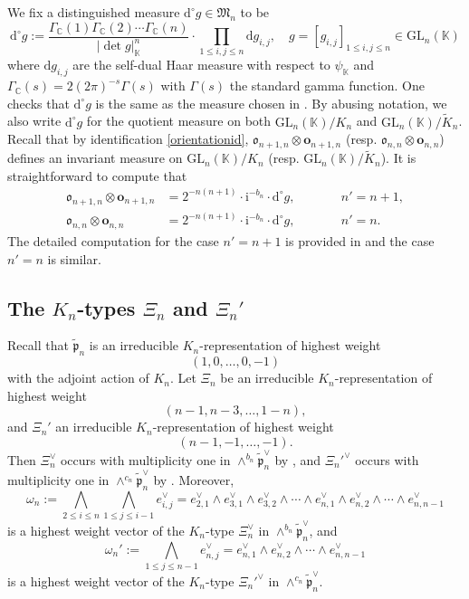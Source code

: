 \documentclass[12pt, a4paper]{amsart}
\newcommand{\GL}{{\mathrm{GL}}}
\newcommand{\C}{\mathbb{C}}
\newcommand{\K}{\mathbb{K}}
\theoremstyle{Theorem}
\theoremstyle{Theorem}
\theoremstyle{Theorem}
\theoremstyle{Theorem}
\theoremstyle{Plain}
\theoremstyle{Definition}
\begin{document}
	We fix a distinguished measure $\mathrm{d}^{\circ}g\in\mathfrak{M}_{n}$ to be 
	\[
	\mathrm{d}^{\circ}g:=\frac{\Gamma_{\C}(1)\Gamma_{\C}(2)\cdots\Gamma_{\C}(n)}{|\det g|_{\K}^n}\cdot\prod_{1\leq i,j\leq n}\mathrm{d}g_{i,j},\quad g=[g_{i,j}]_{1\leq i,j\leq n}\in\GL_{n}(\K)
	\]
	where $\mathrm{d}g_{i,j}$ are the self-dual Haar measure with respect to $\psi_{\K}$ and $\Gamma_{\C}(s)=2(2\pi)^{-s}\Gamma(s)$ with $\Gamma(s)$ the standard gamma function. One checks that $\mathrm{d}^{\circ}g$ is the same as the measure chosen in \cite[Section 2.2]{IM}. By abusing notation, we also write $\mathrm{d}^{\circ}g$ for the quotient measure on both $\GL_n(\K)/K_n$ and $\GL_n(\K)/\widetilde{K}_n$. Recall that by identification \eqref{orientationid}, $\mathfrak{o}_{n+1,n}\otimes\mathbf{o}_{n+1,n}$ (resp. $\mathfrak{o}_{n,n}\otimes\mathbf{o}_{n,n}$) defines an invariant measure on $\GL_n(\K)/K_n$ (resp. $\GL_n(\K)/\widetilde{K}_n$). It is straightforward to compute that
	\begin{equation}
		\label{measureid}
		\begin{aligned}
			\mathfrak{o}_{n+1,n}\otimes\mathbf{o}_{n+1,n}&=2^{-n(n+1)}\cdot\mathrm{i}^{-b_n}\cdot\mathrm{d}^{\circ}g,&\qquad&n'=n+1,\\
			\mathfrak{o}_{n,n}\otimes\mathbf{o}_{n,n}&=2^{-n(n+1)}\cdot\mathrm{i}^{-b_n}\cdot\mathrm{d}^{\circ}g,&\qquad&n'=n.
		\end{aligned}
	\end{equation}
	The detailed computation for the case $n'=n+1$ is provided in \cite[Section 3.2]{HMN} and the case $n'=n$ is similar.
	
	\subsection{The $K_n$-types $\Xi_n$ and $\Xi_n'$}
	
	Recall that $\widetilde{\mathfrak{p}}_n$ is an irreducible $K_n$-representation of highest weight 
	\[
	(1,0,\dots,0,-1)
	\]
	with the adjoint action of $K_n$. Let $\Xi_n$ be an irreducible $K_n$-representation of highest weight 
	\[
	(n-1,n-3,\dots,1-n),
	\]
	and $\Xi_n'$ an irreducible $K_n$-representation of highest weight 
	\[
	(n-1,-1,\dots,-1).
	\]
	Then $\Xi^{\vee}_n$ occurs with multiplicity one in $\wedge^{b_n}\widetilde{\mathfrak{p}}^{\vee}_n$ by \cite[Lemma 4.5]{DX}, and $\Xi_n'^{\vee}$ occurs with multiplicity one in $\wedge^{c_n}\widetilde{\mathfrak{p}}^{\vee}_n$ by \cite[Lemma 4.3]{DX}. Moreover,
	\[
	\omega_n:=\bigwedge_{2\leq i\leq n}\bigwedge_{1\leq j\leq i-1}e_{i,j}^{\vee}=e_{2,1}^{\vee}\wedge e_{3,1}^{\vee}\wedge e_{3,2}^{\vee}\wedge\cdots\wedge e_{n,1}^{\vee}\wedge e_{n,2}^{\vee}\wedge\cdots\wedge e_{n,n-1}^{\vee}
	\]
	is a highest weight vector of the $K_n$-type $\Xi^{\vee}_n$ in $\wedge^{b_n}\widetilde{\mathfrak{p}}^{\vee}_n$, and
	\[
	\omega_n':=\bigwedge_{1\leq j\leq n-1}e_{n,j}^{\vee}=e_{n,1}^{\vee}\wedge e_{n,2}^{\vee}\wedge\cdots\wedge e_{n,n-1}^{\vee}
	\]
	is a highest weight vector of the $K_n$-type $\Xi_n'^{\vee}$ in $\wedge^{c_n}\widetilde{\mathfrak{p}}^{\vee}_n$.
	
\end{document}
